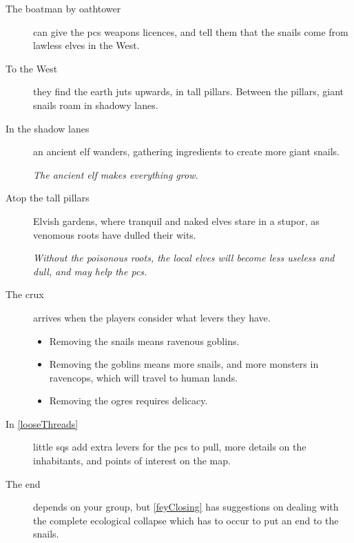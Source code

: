 \begin{multicols}{2}
\begin{description}
  \item[The boatman by \gls{oathtower}]
  can give the \glspl{pc} weapons licences, and tell them that the snails come from lawless elves in the West.

  \item[To the West]
  they find the earth juts upwards, in tall pillars.
  Between the pillars, giant snails roam in shadowy lanes.

  \item[In the shadow lanes]
  an ancient elf wanders, gathering \glspl{ingredient} to create more giant snails.

  \textit{The ancient elf makes everything grow.}

  \item[Atop the tall pillars]
  Elvish gardens, where tranquil and naked elves stare in a stupor, as venomous roots have dulled their wits.

  \textit{Without the poisonous roots, the local elves will become less useless and dull, and may help the \glspl{pc}.}

  \item[The crux]
  arrives when the players consider what levers they have.
  \begin{itemize}
    \item
    Removing the snails means ravenous goblins.
    \item
    Removing the goblins means more snails, and more monsters in \gls{ravencops}, which will travel to human lands.
    \item
    Removing the \glspl{ogre} requires delicacy.
  \end{itemize}
  \item[In \autoref{looseThreads}]
  little \glspl{sq} add extra levers for the \glspl{pc} to pull, more details on the inhabitants, and points of interest on the map.

  \item[The end]
  depends on your group, but \autoref{feyClosing} has suggestions on dealing with the complete ecological collapse which has to occur to put an end to the snails.
\end{description}


\end{multicols}
